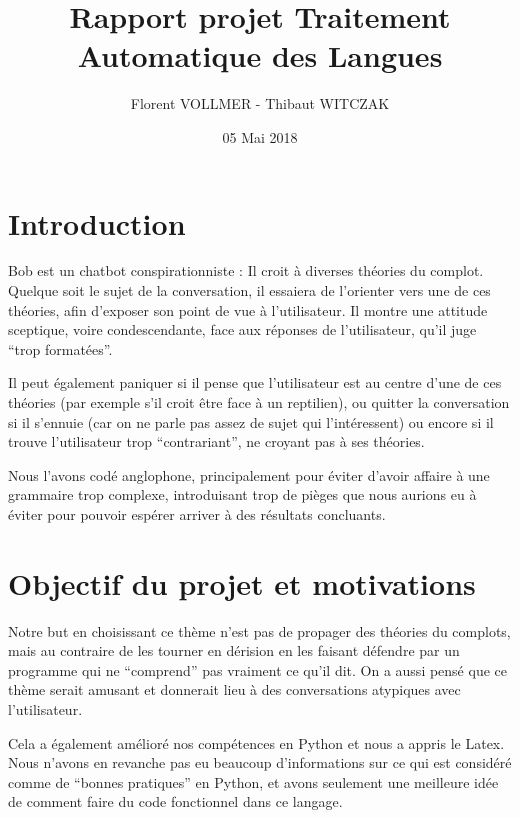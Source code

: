 \documentclass[paper=a4, 12pt]{report}
\begin{document}
\title{Rapport projet Traitement Automatique des Langues}
\author{Florent VOLLMER - Thibaut WITCZAK}
\date{05 Mai 2018}
\maketitle

\section{Introduction}
\vspace{0.5cm}
Bob est un chatbot conspirationniste : Il croit à diverses théories du complot. Quelque soit le sujet de la conversation, il essaiera de l’orienter vers une de ces théories, afin d’exposer son point de vue à l’utilisateur. Il montre une attitude sceptique, voire condescendante, face aux réponses de l’utilisateur, qu’il juge “trop formatées”.

\vspace{0.5cm}

Il peut également paniquer si il pense que l’utilisateur est au centre d’une de ces théories (par exemple s’il croit être face à un reptilien), ou quitter la conversation si il s’ennuie (car on ne parle pas assez de sujet qui l’intéressent) ou encore si il trouve l’utilisateur trop “contrariant”, ne croyant pas à ses théories.

\vspace{0.5cm}

Nous l’avons codé anglophone, principalement pour éviter d’avoir affaire à une grammaire trop complexe, introduisant trop de pièges que nous aurions eu à éviter pour pouvoir espérer arriver à des résultats concluants.

\section{Objectif du projet et motivations}
\vspace{0.5cm}
Notre but en choisissant ce thème n’est pas de propager des théories du complots, mais au contraire de les tourner en dérision en les faisant défendre par un programme qui ne “comprend” pas vraiment ce qu’il dit. On a aussi pensé que ce thème serait amusant et donnerait lieu à des conversations atypiques avec l’utilisateur.


\vspace{0.5cm}

Cela a également amélioré nos compétences en Python et nous a appris le Latex. Nous n’avons en revanche pas eu beaucoup d’informations sur ce qui est considéré comme de “bonnes pratiques” en Python, et avons seulement une meilleure idée de comment faire du code fonctionnel dans ce langage.
\end{document}
